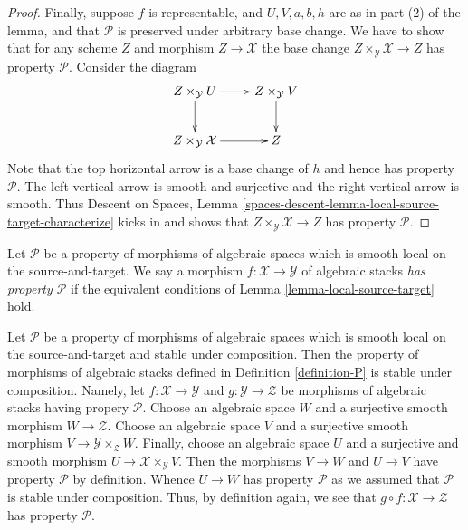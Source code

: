 \begin{proof}
\medskip\noindent
Finally, suppose $f$ is representable, and $U, V, a, b, h$ are
as in part (2) of the lemma, and that $\mathcal{P}$ is preserved under
arbitrary base change. We have to show that for any scheme
$Z$ and morphism $Z \to \mathcal{X}$ the base change
$Z \times_\mathcal{Y} \mathcal{X} \to Z$
has property $\mathcal{P}$. Consider the diagram
$$
\xymatrix{
Z \times_\mathcal{Y} U \ar[d] \ar[r] &
Z \times_\mathcal{Y} V \ar[d] \\
Z \times_\mathcal{Y} \mathcal{X} \ar[r] &
Z
}
$$
Note that the top horizontal arrow is a base change of $h$ and
hence has property $\mathcal{P}$. The left vertical arrow is smooth
and surjective and the right vertical arrow is smooth. Thus
Descent on Spaces,
Lemma \ref{spaces-descent-lemma-local-source-target-characterize}
kicks in and shows that $Z \times_\mathcal{Y} \mathcal{X} \to Z$
has property $\mathcal{P}$.
\end{proof}

\begin{definition}
\label{definition-P}
Let $\mathcal{P}$ be a property of morphisms of algebraic spaces
which is smooth local on the source-and-target.
We say a morphism $f : \mathcal{X} \to \mathcal{Y}$ of algebraic stacks
{\it has property $\mathcal{P}$} if the equivalent conditions of
Lemma \ref{lemma-local-source-target}
hold.
\end{definition}

\begin{remark}
\label{remark-composition}
Let $\mathcal{P}$ be a property of morphisms of algebraic spaces
which is smooth local on the source-and-target and stable under composition.
Then the property of morphisms of algebraic stacks defined in
Definition \ref{definition-P}
is stable under composition. Namely, let $f : \mathcal{X} \to \mathcal{Y}$
and $g : \mathcal{Y} \to \mathcal{Z}$ be morphisms of algebraic stacks
having propery $\mathcal{P}$. Choose an algebraic space $W$ and a
surjective smooth morphism $W \to \mathcal{Z}$. Choose an algebraic space
$V$ and a surjective smooth morphism $V \to \mathcal{Y} \times_\mathcal{Z} W$.
Finally, choose an algebraic space $U$ and a surjective and smooth morphism
$U \to \mathcal{X} \times_\mathcal{Y} V$. Then the morphisms
$V \to W$ and $U \to V$ have property $\mathcal{P}$ by definition.
Whence $U \to W$ has property $\mathcal{P}$ as we assumed that
$\mathcal{P}$ is stable under composition. Thus, by definition again,
we see that $g \circ f : \mathcal{X} \to \mathcal{Z}$ has
property $\mathcal{P}$.
\end{remark}

